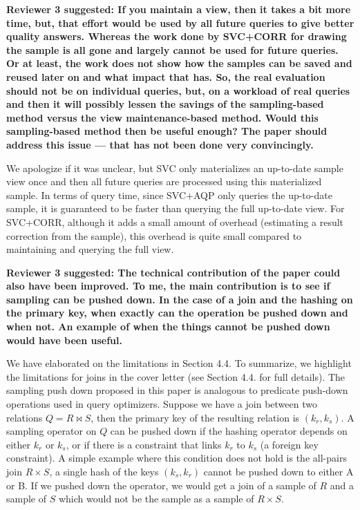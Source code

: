 \vspace{1.5em}

\textbf{Reviewer 3 suggested:  If you maintain a view, then it takes a bit more time, but, that effort would be used by all future queries to give better quality answers. Whereas the work done by SVC+CORR for drawing the sample is all gone and largely cannot be used for future queries. Or at least, the work does not show how the samples can be saved and reused later on and what impact that has. So, the real evaluation should not be on individual queries, but, on a workload of real queries and then it will possibly lessen the savings of the sampling-based method versus the view maintenance-based method. Would this sampling-based method then be useful enough? The paper should address this issue --- that has not been done very convincingly.}

We apologize if it was unclear, but SVC only materializes an up-to-date sample view once and then all future queries are processed using this materialized sample. In terms of query time, since SVC+AQP only queries the up-to-date sample, it is guaranteed to be faster than querying the full up-to-date view. For SVC+CORR, although it adds a small amount of overhead (estimating a result correction from the sample), this overhead is quite small compared to maintaining and querying the full view. 

\vspace{1.5em}

\textbf{Reviewer 3 suggested: The technical contribution of the paper could also have been improved. To me, the main contribution is to see if sampling can be pushed down. In the case of a join and the hashing on the primary key, when exactly can the operation be pushed down and when not. An example of when the things cannot be pushed down would have been useful. }

We have elaborated on the limitations in Section 4.4.
To summarize, we highlight the limitations for joins in the cover letter (see Section 4.4. for full details).
The sampling push down proposed in this paper is analogous to predicate push-down operations used in query optimizers. 
Suppose we have a join between two relations $Q = R \bowtie S$, then the primary key of the resulting relation is $(k_r, k_s)$.
A sampling operator on $Q$ can be pushed down if the hashing operator depends on either $k_r$ or $k_s$, or if there is a constraint that links $k_r$ to $k_s$ (a foreign key constraint).
A simple example where this condition does not hold is the all-pairs join $R \times S$, a single hash of the keys $(k_s, k_r)$ cannot be pushed down to either A or B. 
If we pushed down the operator, we would get a join of a sample of $R$ and a sample of $S$ which would not be the sample as a sample of $R \times S$.

